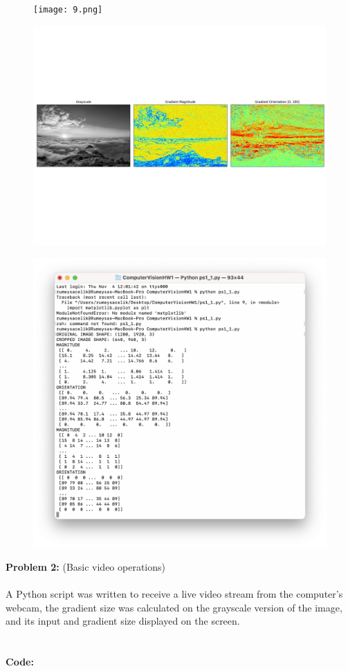 \documentclass[a4paper, 12pt]{report}
\begin{document}
\begin{figure}
\texttt{[image: 9.png]}
\centering
\end{figure}
\begin{figure}
\includegraphics[scale=.39]{gradient.png}
\centering
\end{figure}
\begin{figure}
\includegraphics[scale=.43]{10.png}
\centering
\end{figure}
\newpage
\textbf{Problem 2:} (Basic video operations)
\\ \\
A Python script was written to receive a live video stream from the computer's webcam, the gradient size was calculated on the grayscale version of the image, and its input and gradient size displayed on the screen.
\\ \\ \\
\textbf{Code:}
\end{document}
